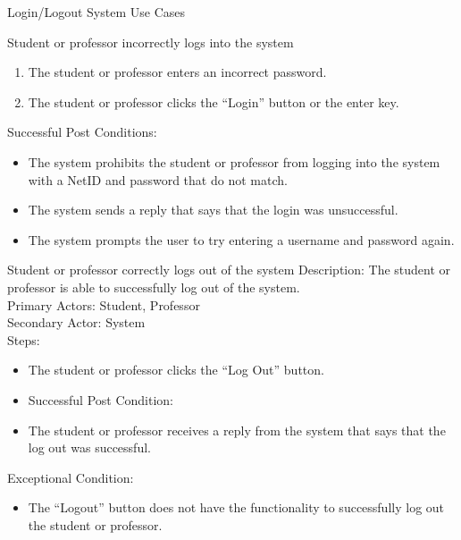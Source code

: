 \documentclass{article}
\begin{document}
\begin{section}{Login/Logout System Use Cases}
\begin{subsection}{Student or professor incorrectly logs into the system}
\begin{enumerate}
            	and/or
            \item The student or professor enters an incorrect password.
            \item The student or professor clicks the “Login” button or the enter key.\\
        \end{enumerate}
    Successful Post Conditions:
        \begin{itemize}
            \item The system prohibits the student or professor from logging into the system with a NetID and password that do not match.
            \item The system sends a reply that says that the login was unsuccessful.
            \item The system prompts the user to try entering a username and password again.
        \end{itemize}
    \end{subsection}
    \begin{subsection}{Student or professor correctly logs out of the system}
        Description: The student or professor is able to successfully log out of the system.\\
        Primary Actors: Student, Professor\\
        Secondary Actor: System\\
        Steps:
        \begin{itemize}
            \item The student or professor clicks the “Log Out” button.
            \item Successful Post Condition:
            \item The student or professor receives a reply from the system that says that the log out was successful.
        \end{itemize}
        Exceptional Condition:
        \begin{itemize}
            \item The “Logout” button does not have the functionality to successfully log out the student or professor.
        \end{itemize}
    \end{subsection}
\end{section}



\end{document}
